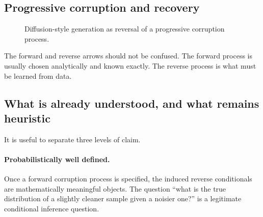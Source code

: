 \subsection*{Progressive corruption and recovery}

\begin{figure}[h]
\centering
{}
\caption{Diffusion-style generation as reversal of a progressive corruption process.}
\end{figure}

The forward and reverse arrows should not be confused.
The forward process is usually chosen analytically and known exactly.
The reverse process is what must be learned from data.

\subsection*{What is already understood, and what remains heuristic}

It is useful to separate three levels of claim.

\paragraph{Probabilistically well defined.}
Once a forward corruption process is specified, the induced reverse conditionals are mathematically meaningful objects.
The question ``what is the true distribution of a slightly cleaner sample given a noisier one?'' is a legitimate conditional inference question.

